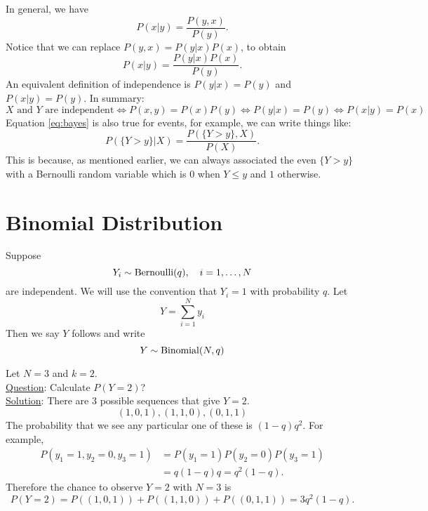  In general, we have 
\begin{equation}
P(x|y) = \frac{P(y,x)}{P(y)}.
\end{equation}
Notice that we can replace $P(y,x) = P(y|x)P(x)$, to obtain 
\begin{equation}\label{eq:bayes}
P(x|y) = \frac{P(y|x)P(x)}{P(y)}.
\end{equation}
An equivalent definition of independence is $P(y|x)  = P(y)$ and $P(x|y) = P(y)$.  In summary: 
\begin{equation*}
\text{$X$ and $Y$ are independent} \iff P(x,y) = P(x)P(y) \iff P(y|x) = P(y) \iff P(x|y) = P(x)
\end{equation*}
Equation \eqref{eq:bayes} is also true for events, for example, we can write things like: 
\begin{equation}\label{eq:bayes}
P(\{Y>y\}|X) = \frac{P(\{Y>y\},X)}{P(X)}.
\end{equation}
This is because, as mentioned earlier, we can always associated the even $\{Y>y\}$ with a Bernoulli random variable which is $0$ when $Y \le y$ and $1$ otherwise. 



  \section{Binomial Distribution}
 Suppose 
  \begin{equation*}
  Y_i \sim {\rm Bernoulli}(q),\quad i =1,\dots, N
  \end{equation*} 
  are independent. We will use the convention that $Y_i=1$ with probability $q$. Let
\begin{equation*}
Y = \sum_{i=1}^N y_i
\end{equation*}
 Then we say $Y$ follows  and write
\begin{equation*}
Y \sim {\rm Binomial}(N,q)
\end{equation*}

 
 
 \begin{example}
Let $N=3$ and $k=2$. \\

\noindent
\underline{Question}: Calculate $P(Y=2)$?\\

\noindent
\underline{Solution}: There are 3 possible sequences that give $Y=2$. 
\begin{equation*}
(1,0,1),(1,1,0),(0,1,1)
\end{equation*}
The probability that we see any particular one of these is $(1-q)q^2$. For example, 
\begin{align*}
P(y_1 = 1,y_2 = 0,y_3 = 1) &= P(y_1 = 1)P(y_2=0)P(y_3 =1) \\
&= q(1-q)q = q^2(1-q).
\end{align*}
Therefore the chance to observe $Y=2$ with $N=3$ is
\begin{equation*}
P(Y=2) = P((1,0,1)) +P((1,1,0))  + P((0,1,1))  =  3q^2(1-q). 
\end{equation*}


 \end{example}
 
